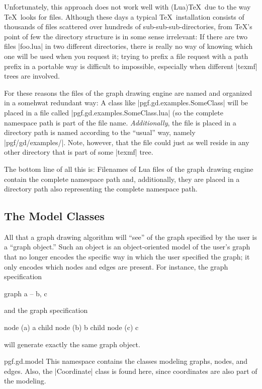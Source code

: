 Unfortunately, this approach does not work well with (Lua)\TeX\ due to
the way \TeX\ looks for files. Although these days a typical \TeX\
installation consists of thousands of files scattered over hundreds of
sub-sub-sub-directories, from \TeX's point of few the directory
structure is in some sense irrelevant: If there are two files
|foo.lua| in two different directories, there is really no way of
knowing which one will be used when you request it; trying to prefix a
file request with a path prefix in a portable way is difficult to
impossible, especially when different |texmf| trees are involved.

For these reasons the files of the graph drawing engine are named and
organized in a somehwat redundant way: A class like
|pgf.gd.examples.SomeClass| will be placed in a file called
|pgf.gd.examples.SomeClass.lua| (so the complete namespace path is
part of the file name. \emph{Additionally}, the file is placed in a
directory path is named according to the ``usual'' way, namely
|pgf/gd/examples/|. Note, however, that the file could just as well
reside in any other directory that is part of some |texmf| tree.

The bottom line of all this is: Filenames of Lua files of the graph
drawing engine contain the complete namespace path and, additionally,
they are placed in a directory path also representing the complete
namespace path. 


\subsection{The Model Classes}

\label{section-gd-models}

All that a graph drawing algorithm will ``see'' of the graph specified
by the user is a ``graph object.'' Such an object is an
object-oriented model of the user's graph that no longer encodes the
specific way in which the user specified the graph; it only encodes
which nodes and edges are present. For instance, the graph
specification 
\begin{codeexample}
graph { a -- {b, c} }
\end{codeexample}
\noindent and the graph specification
\begin{codeexample}
node (a) { a }
child { node (b) {b} }
child { node (c) {c} }
\end{codeexample}
will generate exactly the same graph object.

\begin{luanamespace}{pgf.gd.}{model}
  This namespace contains the classes modeling graphs,
  nodes, and edges. Also, the |Coordinate| class is found here, since
  coordinates are also part of the modeling.  
\end{luanamespace}

